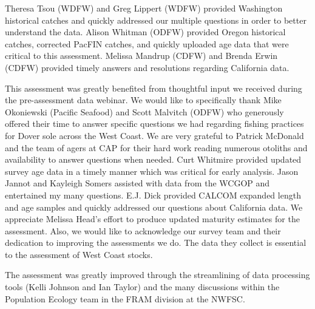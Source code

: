 \documentclass[11pt,
  english,
  a4paper,
]{article}
\begin{document}
\leavevmode\tagmcend\tagstructend\par


Theresa Tsou (WDFW) and Greg Lippert (WDFW) provided Washington historical catches and quickly addressed our multiple questions in order to better understand the data. Alison Whitman (ODFW) provided Oregon historical catches, corrected PacFIN catches, and quickly uploaded age data that were critical to this assessment. Melissa Mandrup (CDFW) and Brenda Erwin (CDFW) provided timely answers and resolutions regarding California data.

\leavevmode\tagmcend\tagstructend\par


This assessment was greatly benefited from thoughtful input we received during the pre-assessment data webinar. We would like to specifically thank Mike Okoniewski (Pacific Seafood) and Scott Malvitch (ODFW) who generously offered their time to answer specific questions we had regarding fishing practices for Dover sole across the West Coast. We are very grateful to Patrick McDonald and the team of agers at CAP for their hard work reading numerous otoliths and availability to answer questions when needed. Curt Whitmire provided updated survey age data in a timely manner which was critical for early analysis. Jason Jannot and Kayleigh Somers assisted with data from the WCGOP and entertained my many questions. E.J. Dick provided CALCOM expanded length and age samples and quickly addressed our questions about California data. We appreciate Melissa Head's effort to produce updated maturity estimates for the assessment. Also, we would like to acknowledge our survey team and their dedication to improving the assessments we do. The data they collect is essential to the assessment of West Coast stocks.

\leavevmode\tagmcend\tagstructend\par


The assessment was greatly improved through the streamlining of data processing tools (Kelli Johnson and Ian Taylor) and the many discussions within the Population Ecology team in the FRAM division at the NWFSC.

\leavevmode\tagmcend\tagstructend\par
\end{document}
